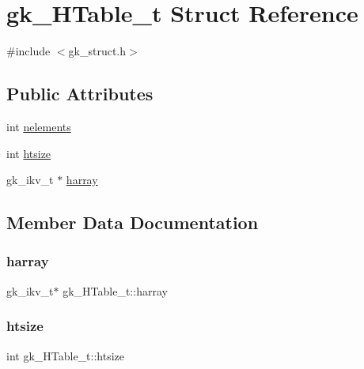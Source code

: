 \hypertarget{structgk___h_table__t}{}\section{gk\+\_\+\+H\+Table\+\_\+t Struct Reference}
\label{structgk___h_table__t}


{\ttfamily \#include $<$gk\+\_\+struct.\+h$>$}

\subsection*{Public Attributes}
\begin{DoxyCompactItemize}
\item 
int \hyperlink{structgk___h_table__t_a71acd4583496d0d4c5cb8dfbaaf478a7}{nelements}
\item 
int \hyperlink{structgk___h_table__t_a134c8b357760d77876779e8c6d5eba13}{htsize}
\item 
gk\+\_\+ikv\+\_\+t $\ast$ \hyperlink{structgk___h_table__t_a9e7cc6e92493a91c2cbf8b953e72b235}{harray}
\end{DoxyCompactItemize}


\subsection{Member Data Documentation}
\mbox{\label{structgk___h_table__t_a9e7cc6e92493a91c2cbf8b953e72b235}} 
\subsubsection{\texorpdfstring{harray}{harray}}
{\footnotesize\ttfamily gk\+\_\+ikv\+\_\+t$\ast$ gk\+\_\+\+H\+Table\+\_\+t\+::harray}

\mbox{\label{structgk___h_table__t_a134c8b357760d77876779e8c6d5eba13}} 
\subsubsection{\texorpdfstring{htsize}{htsize}}
{\footnotesize\ttfamily int gk\+\_\+\+H\+Table\+\_\+t\+::htsize}

